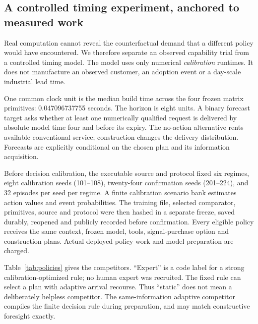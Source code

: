 \documentclass[11pt,a4paper]{article}
\begin{document}
\subsection{A controlled timing experiment, anchored to measured work}
Real computation cannot reveal the counterfactual demand that a different policy would have encountered. We therefore separate an observed capability trial from a controlled timing model. The model uses only numerical \emph{calibration} runtimes. It does not manufacture an observed customer, an adoption event or a day-scale industrial lead time.

One common clock unit is the median build time across the four frozen matrix primitives: 0.047096737755 seconds. The horizon is eight units. A binary forecast target asks whether at least one numerically qualified request is delivered by absolute model time four and before its expiry. The no-action alternative rents available conventional service; construction changes the delivery distribution. Forecasts are explicitly conditional on the chosen plan and its information acquisition.

Before decision calibration, the executable source and protocol fixed six regimes, eight calibration seeds (101--108), twenty-four confirmation seeds (201--224), and 32 episodes per seed per regime. A finite calibration scenario bank estimates action values and event probabilities. The training file, selected comparator, primitives, source and protocol were then hashed in a separate freeze, saved durably, reopened and publicly recorded before confirmation. Every eligible policy receives the same context, frozen model, tools, signal-purchase option and construction plans. Actual deployed policy work and model preparation are charged.

Table~\ref{tab:policies} gives the competitors. ``Expert'' is a code label for a strong calibration-optimized rule; no human expert was recruited. The fixed rule can select a plan with adaptive arrival recourse. Thus ``static'' does not mean a deliberately helpless competitor. The same-information adaptive competitor compiles the finite decision rule during preparation, and may match constructive foresight exactly.
\end{document}
